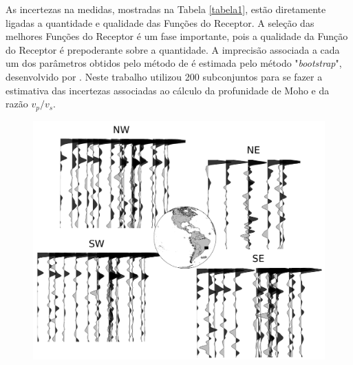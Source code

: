 As incertezas na medidas, mostradas na Tabela \ref{tabela1}, estão diretamente ligadas a quantidade e qualidade das Funções do Receptor. A seleção das melhores Funções do Receptor é um fase importante, pois a qualidade da Função do Receptor é prepoderante sobre a quantidade. A imprecisão associada a cada um dos parâmetros obtidos pelo método de \cite{Zhu_Kanamori_2000} é estimada pelo método "\textit{bootstrap}", desenvolvido por \cite{efron_statistical_1991}. Neste trabalho utilizou 200  subconjuntos para se fazer a estimativa das incertezas associadas ao  cálculo da profunidade de Moho e da razão $v_{p}/v_{s}$.

\begin{figure}[!ht]
\centering
\includegraphics[scale=0.5]{RF_azimute.png}
\caption{}
\label{RF_perfil_NW}
\end{figure}



